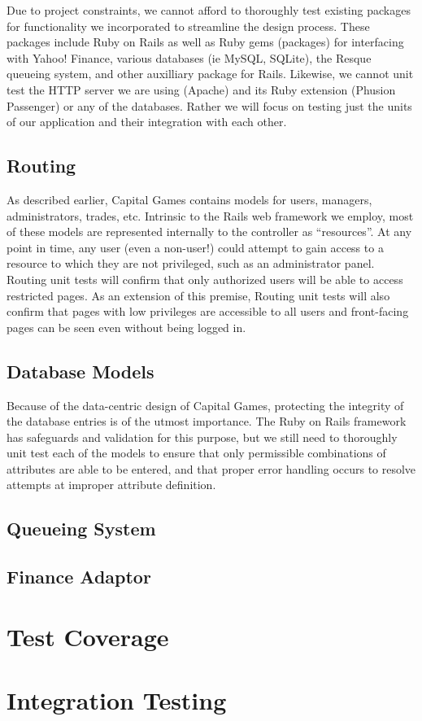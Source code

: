 Due to project constraints, we cannot afford to thoroughly
test existing packages for functionality we incorporated to
streamline the design process. These packages include Ruby
on Rails
as well as Ruby gems (packages) for interfacing with Yahoo! Finance,
various databases (ie MySQL, SQLite), the Resque queueing system,
and other auxilliary package for Rails. Likewise, we
cannot unit test
the HTTP server we are using (Apache) and its Ruby 
extension (Phusion Passenger) or any of the databases. Rather
we will focus on testing just the units of our application and
their integration with each other.

\subsection{Routing}

As described earlier, Capital Games contains models for
users, managers, administrators, trades, etc. Intrinsic to the Rails web framework
we employ, most of these models are represented internally to the 
controller as ``resources''. \cite{guides:routing} At any
point in time, any user (even a non-user!) could attempt to gain
access to a resource to which they are not privileged, such as an
administrator panel. Routing unit tests will confirm that only
authorized users will be able to access restricted pages. As an
extension of this premise, Routing unit tests will also confirm
that pages with low privileges are accessible to all users and
front-facing pages can be seen even without being logged in.

\subsection{Database Models}

Because of the data-centric design of Capital Games, protecting the
integrity of the database entries is of the utmost importance. The
Ruby on Rails framework has safeguards and validation for this purpose,
but we still need to thoroughly unit test each of the models to ensure
that only permissible combinations of attributes are able to be entered,
and that proper error handling occurs to resolve attempts at improper
attribute definition.

\subsection{Queueing System}

\subsection{Finance Adaptor}

\section{Test Coverage}

\section{Integration Testing}